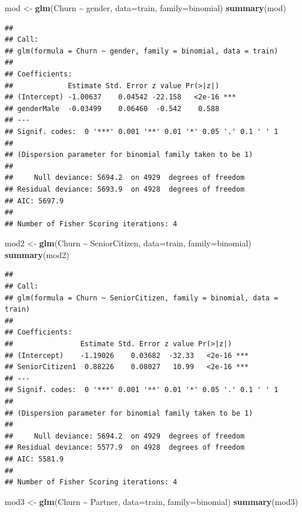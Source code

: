 \documentclass[
  twoside]{article}
\newenvironment{Shaded}{\begin{snugshade}}{\end{snugshade}}
\newcommand{\AttributeTok}[1]{\textcolor[rgb]{0.13,0.29,0.53}{#1}}
\newcommand{\FunctionTok}[1]{\textcolor[rgb]{0.13,0.29,0.53}{\textbf{#1}}}
\newcommand{\NormalTok}[1]{#1}
\newcommand{\OtherTok}[1]{\textcolor[rgb]{0.56,0.35,0.01}{#1}}
\newcommand{\SpecialCharTok}[1]{\textcolor[rgb]{0.81,0.36,0.00}{\textbf{#1}}}
\begin{document}
\begin{Shaded}
\begin{Highlighting}[]
\NormalTok{mod }\OtherTok{\textless{}{-}} \FunctionTok{glm}\NormalTok{(Churn }\SpecialCharTok{\textasciitilde{}}\NormalTok{ gender, }\AttributeTok{data=}\NormalTok{train, }\AttributeTok{family=}\NormalTok{binomial)}
\FunctionTok{summary}\NormalTok{(mod)}
\end{Highlighting}
\end{Shaded}

\begin{verbatim}
## 
## Call:
## glm(formula = Churn ~ gender, family = binomial, data = train)
## 
## Coefficients:
##             Estimate Std. Error z value Pr(>|z|)    
## (Intercept) -1.00637    0.04542 -22.158   <2e-16 ***
## genderMale  -0.03499    0.06460  -0.542    0.588    
## ---
## Signif. codes:  0 '***' 0.001 '**' 0.01 '*' 0.05 '.' 0.1 ' ' 1
## 
## (Dispersion parameter for binomial family taken to be 1)
## 
##     Null deviance: 5694.2  on 4929  degrees of freedom
## Residual deviance: 5693.9  on 4928  degrees of freedom
## AIC: 5697.9
## 
## Number of Fisher Scoring iterations: 4
\end{verbatim}

\begin{Shaded}
\begin{Highlighting}[]
\NormalTok{mod2 }\OtherTok{\textless{}{-}} \FunctionTok{glm}\NormalTok{(Churn }\SpecialCharTok{\textasciitilde{}}\NormalTok{ SeniorCitizen, }\AttributeTok{data=}\NormalTok{train, }\AttributeTok{family=}\NormalTok{binomial)}
\FunctionTok{summary}\NormalTok{(mod2)}
\end{Highlighting}
\end{Shaded}

\begin{verbatim}
## 
## Call:
## glm(formula = Churn ~ SeniorCitizen, family = binomial, data = train)
## 
## Coefficients:
##                Estimate Std. Error z value Pr(>|z|)    
## (Intercept)    -1.19026    0.03682  -32.33   <2e-16 ***
## SeniorCitizen1  0.88226    0.08027   10.99   <2e-16 ***
## ---
## Signif. codes:  0 '***' 0.001 '**' 0.01 '*' 0.05 '.' 0.1 ' ' 1
## 
## (Dispersion parameter for binomial family taken to be 1)
## 
##     Null deviance: 5694.2  on 4929  degrees of freedom
## Residual deviance: 5577.9  on 4928  degrees of freedom
## AIC: 5581.9
## 
## Number of Fisher Scoring iterations: 4
\end{verbatim}

\begin{Shaded}
\begin{Highlighting}[]
\NormalTok{mod3 }\OtherTok{\textless{}{-}} \FunctionTok{glm}\NormalTok{(Churn }\SpecialCharTok{\textasciitilde{}}\NormalTok{ Partner, }\AttributeTok{data=}\NormalTok{train, }\AttributeTok{family=}\NormalTok{binomial)}
\FunctionTok{summary}\NormalTok{(mod3)}
\end{Highlighting}
\end{Shaded}
\end{document}
